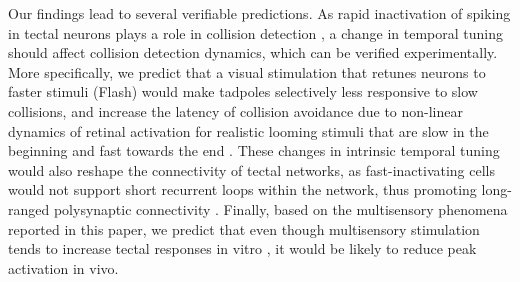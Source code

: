 \documentclass{article}
\begin{document}
Our findings lead to several verifiable predictions. As rapid inactivation of spiking in tectal neurons plays a role in collision detection \citep{khakhalin2014,jang2016}, a change in temporal tuning should affect collision detection dynamics, which can be verified experimentally. More specifically, we predict that a visual stimulation that retunes neurons to faster stimuli (Flash) would make tadpoles selectively less responsive to slow collisions, and increase the latency of collision avoidance due to non-linear dynamics of retinal activation for realistic looming stimuli that are slow in the beginning and fast towards the end \citep{jang2016}. These changes in intrinsic temporal tuning would also reshape the connectivity of tectal networks, as fast-inactivating cells would not support short recurrent loops within the network, thus promoting long-ranged polysynaptic connectivity \citep{fiete2010stdp,clopath2010stdp}. Finally, based on the multisensory phenomena reported in this paper, we predict that even though multisensory stimulation tends to increase tectal responses in vitro \citep{felch2016,truszkowski2017}, it would be likely to reduce peak activation in vivo. 

\end{document}
